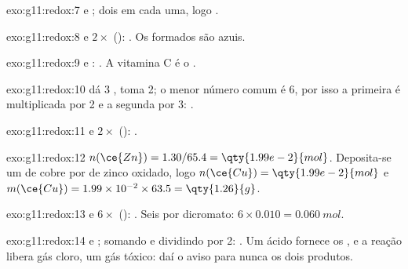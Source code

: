 \begin{solution}{exo:g11:redox:7}
 e ; dois
 em cada uma, logo .
\end{solution}

\begin{solution}{exo:g11:redox:8}
 e $2\times$ ():
. Os   formados são azuis.
\end{solution}

\begin{solution}{exo:g11:redox:9}
 e :
. A vitamina C é o .
\end{solution}

\begin{solution}{exo:g11:redox:10}
 dá 3 ,  toma
2; o menor número comum é 6, por isso a primeira é multiplicada por 2 e
a segunda por 3: .
\end{solution}

\begin{solution}{exo:g11:redox:11}
 e $2\times$ ():
.
\end{solution}

\begin{solution}{exo:g11:redox:12}
$n(\ce{Zn}) = 1.30/65.4 = \qty{1.99e-2}{mol}$. Deposita-se um  de
cobre por  de zinco oxidado, logo $n(\ce{Cu}) = \qty{1.99e-2}{mol}$
e $m(\ce{Cu}) = 1.99\times 10^{-2} \times 63.5 = \qty{1.26}{g}$.
\end{solution}

\begin{solution}{exo:g11:redox:13}
 e
$6\times$ ():
.
Seis  por  dicromato: $6 \times 0.010 = \qty{0.060}{mol}$.
\end{solution}

\begin{solution}{exo:g11:redox:14}
 e ; somando
e dividindo por 2: . Um ácido fornece
os  , e a reação libera gás cloro, um gás tóxico: daí o aviso
para nunca  os dois produtos.
\end{solution}

